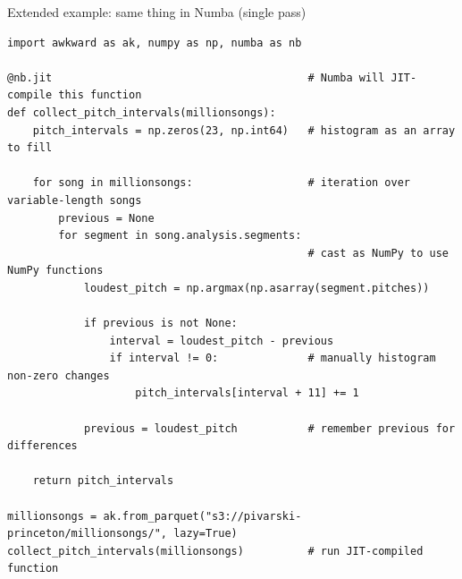 \documentclass[aspectratio=169]{beamer}
\begin{document}
\begin{frame}[fragile]{Extended example: same thing in Numba (single pass)}
\vspace{0.2 cm}
\scriptsize
\begin{verbatim}
import awkward as ak, numpy as np, numba as nb

@nb.jit                                        # Numba will JIT-compile this function
def collect_pitch_intervals(millionsongs):
    pitch_intervals = np.zeros(23, np.int64)   # histogram as an array to fill

    for song in millionsongs:                  # iteration over variable-length songs
        previous = None
        for segment in song.analysis.segments:
                                               # cast as NumPy to use NumPy functions
            loudest_pitch = np.argmax(np.asarray(segment.pitches))

            if previous is not None:
                interval = loudest_pitch - previous
                if interval != 0:              # manually histogram non-zero changes
                    pitch_intervals[interval + 11] += 1

            previous = loudest_pitch           # remember previous for differences

    return pitch_intervals

millionsongs = ak.from_parquet("s3://pivarski-princeton/millionsongs/", lazy=True)
collect_pitch_intervals(millionsongs)          # run JIT-compiled function
\end{verbatim}
\end{frame}
\end{document}

